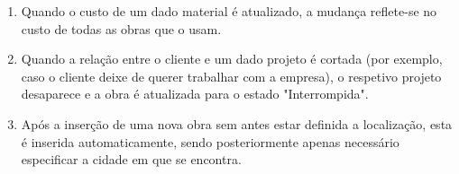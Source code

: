 \documentclass{report}
\begin{document}
		\begin{enumerate}
			\item Quando o custo de um dado material é atualizado, a mudança reflete-se no 
			custo de todas as obras que o usam.
			\item Quando a relação entre o cliente e um dado projeto é cortada (por exemplo,
			caso o cliente deixe de querer trabalhar com a empresa), o respetivo projeto
			desaparece e a obra é atualizada para o estado "Interrompida".
			\item Após a inserção de uma nova obra sem antes estar definida a localização,
			esta é inserida automaticamente, sendo posteriormente apenas necessário 
			especificar a cidade em que se encontra.
		\end{enumerate}
					
		
\end{document}
